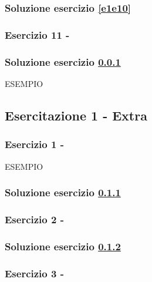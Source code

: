 \documentclass[../main.tex]{subfiles}
\begin{document}
\subsubsection*{Soluzione esercizio \ref{e1e10}}

\vspace*{1.5cm}
\subsubsection{Esercizio 11 - }
\label{e1e11}

\subsubsection*{Soluzione esercizio \ref{e1e11}}

ESEMPIO

\vspace*{1.5cm}
\subsection{Esercitazione 1 - Extra}

\vspace*{1.5cm}
\subsubsection{Esercizio 1 - }
\label{e1ee1}

ESEMPIO

\subsubsection*{Soluzione esercizio \ref{e1ee1}}

\vspace*{1.5cm}
\subsubsection{Esercizio 2 - }
\label{e1ee2}

\subsubsection*{Soluzione esercizio \ref{e1ee2}}

\vspace*{1.5cm}
\subsubsection{Esercizio 3 - }
\label{e1ee3}
\end{document}
